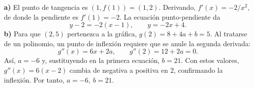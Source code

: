 \textbf{a)} El punto de tangencia es $(1,f(1))=(1,2)$. Derivando, $f'(x)=-2/x^2$, de donde la pendiente es $f'(1)=-2$. La ecuación punto-pendiente da
\[
 y-2=-2(x-1),\qquad\boxed{y=-2x+4}.
\]
\textbf{b)} Para que $(2,5)$ pertenezca a la gráfica, $g(2)=8+4a+b=5$. Al tratarse de un polinomio, un punto de inflexión requiere que se anule la segunda derivada:
\[
 g''(x)=6x+2a,\qquad g''(2)=12+2a=0.
\]
Así, $a=-6$ y, sustituyendo en la primera ecuación, $b=21$. Con estos valores, $g''(x)=6(x-2)$ cambia de negativa a positiva en $2$, confirmando la inflexión. Por tanto, $\boxed{a=-6,\ b=21}$.
